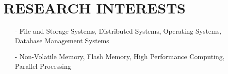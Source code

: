 \section{RESEARCH INTERESTS}
\begin{itemize}[leftmargin=*]
\setlength\itemsep{-0.02in}
\item[-]File and Storage Systems, Distributed Systems, Operating Systems,
Database Management Systems
\item[-]Non-Volatile Memory, Flash Memory, High Performance Computing,
Parallel Processing
\end{itemize}

